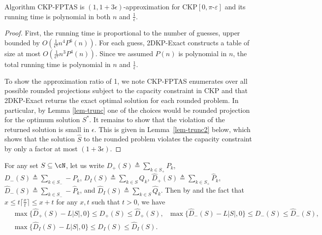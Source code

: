 \begin{theorem}\label{thm:bptas}
Algorithm {\sc CKP-FPTAS} is $(1,1+3\epsilon)$-approximation for \textsc{CKP$[0,\pi\mbox{-}\varepsilon]$} and its running time is polynomial in both $n$ and $\frac{1}{\epsilon}$.
\end{theorem}


\iffalse
\begin{proof}
First, the running time is proportional to the number of guesses, upper bounded by $O(\frac{1}{\epsilon^4} n^{4} P^6(n))$. For each guess, {\sc 2DKP-Exact} constructs a table of size at most $O(\frac{1}{\epsilon^2} n^3 P^4(n))$. Since we assumed $P(n)$ is polynomial in $n$, the total running time is polynomial in $n$ and $\frac{1}{\epsilon}$.

To show the approximation ratio of 1, we note {\sc CKP-FPTAS} enumerates over all possible rounded projections subject to the capacity constraint in {\sc CKP} and that {\sc 2DKP-Exact} returns the exact optimal solution for each rounded problem. In particular, by Lemma \ref{lem-trunc} one of the choices would be rounded projection for the optimum solution $S^\ast$.   
It remains to show that the violation of the returned solution is small in $\epsilon$. This is given in Lemma~\ref{lem-trunc2} below, which shows that the solution $\hat S$ to the rounded problem violates the capacity constraint by only a factor at most $(1+3\epsilon)$. 
\end{proof}


For any set $S\subseteq\cN$, let us write $D_+(S)\triangleq\sum_{k\in S_+}P_k$, $D_-(S)\triangleq\sum_{k\in S_-}-P_k$, $D_I(S)\triangleq\sum_{k\in S}Q_k$, $\hat D_+(S)\triangleq\sum_{k\in S_+} \hat P_k$, $\hat D_-(S)\triangleq\sum_{k\in S_-} -\hat P_k$, and $\hat D_I(S)\triangleq\sum_{k\in S}\hat Q_k$. Then by  and the fact that $x \le t \lceil \frac{x}{t} \rceil  \le x + t$ for any $x,t$ such that $t>0$, we have 
\begin{eqnarray}\label{eq:bds}
&\max\{\hat D_+(S)-L|S|,0\}\le D_+(S)\le \hat D_+(S),~~~\max\{\hat D_-(S)-L|S|,0\}\le D_-(S)\le \hat D_-(S), \nonumber \\ & \max\{\hat D_I(S)-L|S|,0\}\le D_I(S)\le\hat D_I(S).
\end{eqnarray}

